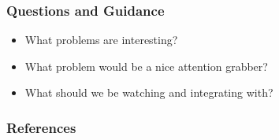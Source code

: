 \documentclass{beamer}
\begin{document}
\begin{frame}
  \frametitle{Questions and Guidance}

  \begin{itemize}
  \item What problems are interesting?
  \item What problem would be a nice attention grabber?
  \item What should we be watching and integrating with?
  \end{itemize}
\end{frame}

\nocite{Coker::Principles-of-R,Haldar:04:Semantic-Remote,Fabrega:1999aa}

\begin{frame}
  \frametitle{References}
  
\end{frame}
\end{document}
